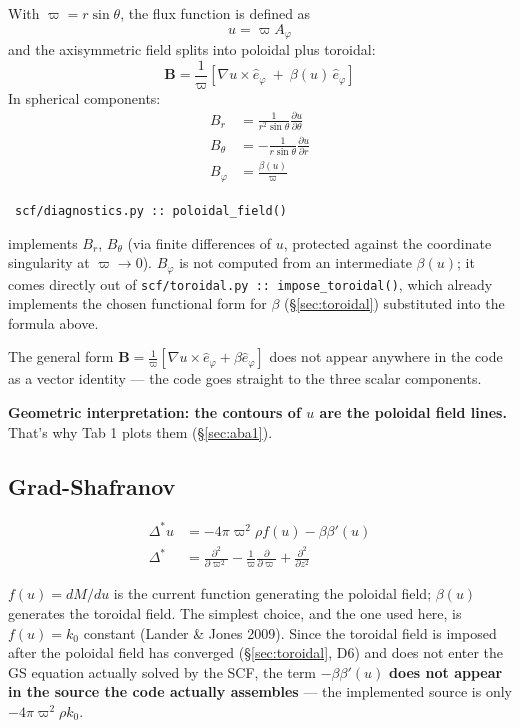 \documentclass[11pt,a4paper]{scrartcl}
\newcommand{\arrowto}[1]{%
  \par\vspace{2pt}\noindent{\color{linkblue}$\rightarrow$}~\texttt{\small #1}\par\vspace{2pt}}
\newcommand{\code}[1]{\texttt{\small #1}}
\begin{document}
With $\varpi=r\sin\theta$, the flux function is defined as
\begin{equation}
u = \varpi A_\varphi
\end{equation}
and the axisymmetric field splits into poloidal plus toroidal:
\begin{equation}
\mathbf{B} = \frac{1}{\varpi}\left[\nabla u \times \hat{e}_\varphi \ +\ \beta(u)\,\hat{e}_\varphi\right]
\end{equation}
In spherical components:
\begin{align}
B_r &= \frac{1}{r^2\sin\theta}\frac{\partial u}{\partial\theta}\\
B_\theta &= -\frac{1}{r\sin\theta}\frac{\partial u}{\partial r}\\
B_\varphi &= \frac{\beta(u)}{\varpi}
\end{align}

\arrowto{scf/diagnostics.py :: poloidal\_field()} implements $B_r$, $B_\theta$ (via finite differences of $u$, protected against the coordinate singularity at $\varpi\to0$). $B_\varphi$ is not computed from an intermediate $\beta(u)$; it comes directly out of \code{scf/toroidal.py :: impose\_toroidal()}, which already implements the chosen functional form for $\beta$ (\S\ref{sec:toroidal}) substituted into the formula above.

The general form $\mathbf{B}=\frac{1}{\varpi}[\nabla u\times\hat e_\varphi+\beta\hat e_\varphi]$ does not appear anywhere in the code as a vector identity --- the code goes straight to the three scalar components.

\textbf{Geometric interpretation: the contours of $u$ are the poloidal
field lines.} That's why Tab 1 plots them (\S\ref{sec:aba1}).

\subsection{Grad-Shafranov}
\label{sec:gs}

\begin{align}
\Delta^* u &= -4\pi\varpi^2\rho f(u) - \beta\beta'(u)\\
\Delta^* &= \frac{\partial^2}{\partial\varpi^2} - \frac{1}{\varpi}\frac{\partial}{\partial\varpi} + \frac{\partial^2}{\partial z^2}
\end{align}

$f(u)=dM/du$ is the current function generating the poloidal field;
$\beta(u)$ generates the toroidal field. The simplest choice, and the one
used here, is $f(u)=k_0$ constant (Lander \& Jones 2009). Since the
toroidal field is imposed after the poloidal field has converged
(\S\ref{sec:toroidal}, D6) and does not enter the GS equation actually
solved by the SCF, the term $-\beta\beta'(u)$ \textbf{does not appear in
the source the code actually assembles} --- the implemented source is
only $-4\pi\varpi^2\rho k_0$.
\end{document}

